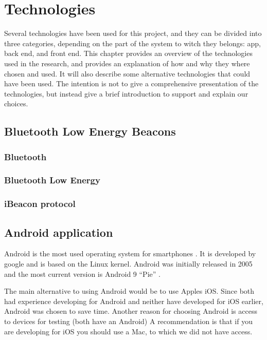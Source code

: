 \documentclass[../Main/thesis.tex]{subfiles}
\begin{document}
\chapter{Technologies}
\label{ch:technologies}

Several technologies have been used for this project, and they can be divided into three categories, depending on the part of the system to witch they belongs: app, back end, and front end.
This chapter provides an overview of the technologies used in the research, and provides an explanation of how and why they where chosen and used.
It will also describe some alternative technologies that could have been used.
The intention is not to give a comprehensive presentation of the technologies, but instead give a brief introduction to support and explain our choices.

\section{Bluetooth Low Energy Beacons}

\subsection{Bluetooth}

\subsection{Bluetooth Low Energy}

\subsection{iBeacon protocol}

\section{Android application}
Android is the most used operating system for smartphones \citep{osmarketshare}. 
It is developed by google and is based on the Linux kernel.
Android was initially released in 2005 \citep{Morrill2008a} and the most current version is Android 9 ``Pie'' \cite{Samat2018}.

The main alternative to using Android would be to use Apples iOS.
Since both had experience developing for Android and neither have developed for iOS earlier, Android  was chosen to save time.
Another reason for choosing Android is access to devices for testing (both have an Android)
A recommendation is that if you are developing for iOS you should use a Mac, to which we did not have access.
\end{document}
